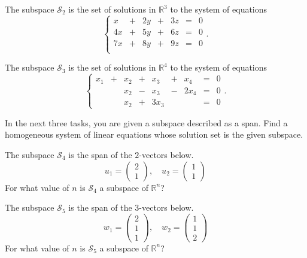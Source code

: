 \documentclass[cahier-main.tex]{subfiles}
\begin{document}
\begin{task} The subspace $\mathcal{S}_2$ is the set of solutions in $\mathbb{R}^3$ to the system of equations
\[
\left\{\begin{array}{rrrrrrr}
x & + & 2y & + & 3z & = & 0 \\
4x & + & 5y & + & 6z & = & 0 \\
7x & + & 8y & + & 9z & = & 0 \\
\end{array}\right. .
\]
\end{task}

\begin{task} The subspace $\mathcal{S}_3$ is the set of solutions in $\mathbb{R}^4$ to the system of equations
\[
\left\{\begin{array}{rrrrrrrrr}
x_1 & + & x_2 & + & x_3 & + & x_4 & = & 0 \\
    &   & x_2 & - & x_3 & - & 2x_4 & = & 0 \\
    &   & x_2 & + & 3x_3 &  &  & = & 0
\end{array}\right. .
\]
\end{task}


In the next three tasks, you are given a subspace described as a span. Find a homogeneous system of linear equations whose solution set is the given subspace.

\begin{task} The subspace $\mathcal{S}_4$ is the span of the $2$-vectors below.
\[
u_1 = \begin{pmatrix} 2 \\ 1 \end{pmatrix}, \quad u_2 = \begin{pmatrix} 1 \\ 1 \end{pmatrix} 
\]
For what value of $n$ is $\mathcal{S}_4$ a subspace of $\mathbb{R}^n$?
\end{task}

\begin{task} The subspace $\mathcal{S}_5$ is the span of the $3$-vectors below.
\[
w_1 = \begin{pmatrix} 2 \\ 1 \\ 1\end{pmatrix}, \quad w_2 =\begin{pmatrix} 1 \\ 1 \\ 2 \end{pmatrix} 
\]
For what value of $n$ is $\mathcal{S}_5$ a subspace of $\mathbb{R}^n$?
\end{task}
\end{document}
